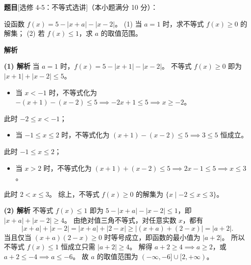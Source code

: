 \begin{answer}

\textbf{题目}[选修 4-5：不等式选讲]（本小题满分 10 分）：

设函数 $f(x)=5-|x+a|-|x-2|$。
(1) 当 $a=1$ 时，求不等式 $f(x)\geqslant 0$ 的解集；
(2) 若 $f(x)\leqslant 1$，求 $a$ 的取值范围。

\textbf{解析}

\textbf{(1) 解析} 当 $a=1$ 时，$f(x) = 5 - |x+1| - |x-2|$。
不等式 $f(x)\geqslant 0$ 即为 $|x+1| + |x-2| \leqslant 5$。
\begin{itemize}
\item 当 $x < -1$ 时，不等式化为 $-(x+1) - (x-2) \leqslant 5 \implies -2x+1 \leqslant 5 \implies x \geqslant -2$。
\end{itemize}
  此时 $-2 \leqslant x < -1$；
\begin{itemize}
\item 当 $-1 \leqslant x \leqslant 2$ 时，不等式化为 $(x+1) - (x-2) \leqslant 5 \implies 3 \leqslant 5$ 恒成立。
\end{itemize}
  此时 $-1 \leqslant x \leqslant 2$；
\begin{itemize}
\item 当 $x > 2$ 时，不等式化为 $(x+1) + (x-2) \leqslant 5 \implies 2x-1 \leqslant 5 \implies x \leqslant 3$。
\end{itemize}
  此时 $2 < x \leqslant 3$。
综上，不等式 $f(x)\geqslant 0$ 的解集为 $\{x\mid -2\leqslant x\leqslant 3\}$。

\textbf{(2) 解析} 不等式 $f(x)\leqslant 1$ 即为 $5 - |x+a| - |x-2| \leqslant 1$，即 $|x+a| + |x-2| \geqslant 4$。
由绝对值三角不等式，对任意实数 $x$，都有
\nopagebreak[4]
\[|x+a| + |x-2| = |x+a| + |2-x| \geqslant |(x+a) + (2-x)| = |a+2|.\]
当且仅当 $(x+a)(2-x)\geqslant 0$ 时等号成立，即函数的最小值为 $|a+2|$。
所以不等式 $f(x)\leqslant 1$ 恒成立只需 $|a+2| \geqslant 4$。
解得 $a+2 \geqslant 4 \implies a \geqslant 2$，或 $a+2 \leqslant -4 \implies a \leqslant -6$。
故 $a$ 的取值范围为 $(-\infty, -6]\cup [2, +\infty)$。


\gkanswer{答案（2）：$(-\infty,-6]\cup[2,+\infty)$}

\end{answer}